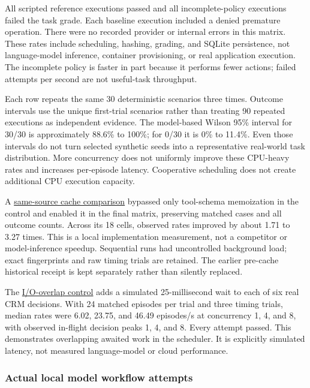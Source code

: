 \documentclass[
  11pt,
  letterpaper,
]{article}
\begin{document}
All scripted reference executions passed and all incomplete-policy
executions failed the task grade. Each baseline execution included a
denied premature operation. There were no recorded provider or internal
errors in this matrix. These rates include scheduling, hashing, grading,
and SQLite persistence, not language-model inference, container
provisioning, or real application execution. The incomplete policy is
faster in part because it performs fewer actions; failed attempts per
second are not useful-task throughput.

Each row repeats the same 30 deterministic scenarios three times.
Outcome intervals use the unique first-trial scenarios rather than
treating 90 repeated executions as independent evidence. The model-based
Wilson 95\% interval for 30/30 is approximately 88.6\% to 100\%; for
0/30 it is 0\% to 11.4\%. Even those intervals do not turn selected
synthetic seeds into a representative real-world task distribution. More
concurrency does not uniformly improve these CPU-heavy rates and
increases per-episode latency. Cooperative scheduling does not create
additional CPU execution capacity.

A
\href{../../examples/benchmark-results/schema-cache-comparison.json}{same-source
cache comparison} bypassed only tool-schema memoization in the control
and enabled it in the final matrix, preserving matched cases and all
outcome counts. Across its 18 cells, observed rates improved by about
1.71 to 3.27 times. This is a local implementation measurement, not a
competitor or model-inference speedup. Sequential runs had uncontrolled
background load; exact fingerprints and raw timing trials are retained.
The earlier pre-cache historical receipt is kept separately rather than
silently replaced.

The \href{../../examples/benchmark-results/io-overlap.json}{I/O-overlap
control} adds a simulated 25-millisecond wait to each of six real CRM
decisions. With 24 matched episodes per trial and three timing trials,
median rates were 6.02, 23.75, and 46.49 episodes/s at concurrency 1, 4,
and 8, with observed in-flight decision peaks 1, 4, and 8. Every attempt
passed. This demonstrates overlapping awaited work in the scheduler. It
is explicitly simulated latency, not measured language-model or cloud
performance.

\subsubsection{Actual local model workflow
attempts}\label{actual-local-model-workflow-attempts}
\end{document}
